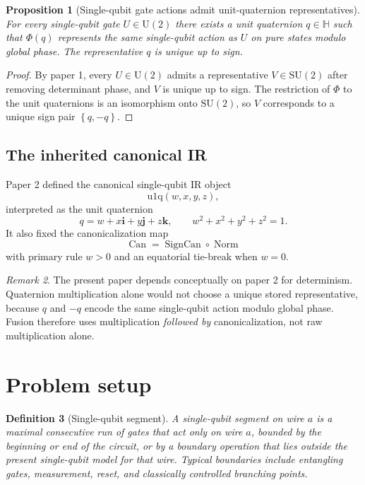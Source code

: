 \documentclass[11pt]{article}
\newtheorem{definition}{Definition}[section]
\newtheorem{proposition}[definition]{Proposition}
\theoremstyle{remark}
\newtheorem{remark}[definition]{Remark}
\newcommand{\HH}{\mathbb{H}}
\newcommand{\SU}{\mathrm{SU}}
\newcommand{\U}{\mathrm{U}}
\newcommand{\ii}{\mathbf{i}}
\newcommand{\jj}{\mathbf{j}}
\newcommand{\kk}{\mathbf{k}}
\newcommand{\set}[1]{\left\{ #1 \right\}}
\newcommand{\uoneq}{\mathrm{u1q}}
\newcommand{\normalize}{\operatorname{Norm}}
\newcommand{\sgncanon}{\operatorname{SignCan}}
\newcommand{\canon}{\operatorname{Can}}
\begin{document}
\begin{proposition}[Single-qubit gate actions admit unit-quaternion representatives]
For every single-qubit gate $U\in\U(2)$ there exists a unit quaternion
$q\in\HH$ such that $\Phi(q)$ represents the same single-qubit action as $U$ on
pure states modulo global phase. The representative $q$ is unique up to sign.
\end{proposition}

\begin{proof}
By paper 1, every $U\in\U(2)$ admits a representative $V\in\SU(2)$ after
removing determinant phase, and $V$ is unique up to sign. The restriction of
$\Phi$ to the unit quaternions is an isomorphism onto $\SU(2)$, so $V$
corresponds to a unique sign pair $\set{q,-q}$.
\end{proof}

\subsection{The inherited canonical IR}

Paper 2 defined the canonical single-qubit IR object
\[
\uoneq(w,x,y,z),
\]
interpreted as the unit quaternion
\[
q=w+x\ii+y\jj+z\kk,\qquad w^2+x^2+y^2+z^2=1.
\]
It also fixed the canonicalization map
\[
\canon=\sgncanon\circ\normalize
\]
with primary rule $w>0$ and an equatorial tie-break when $w=0$.

\begin{remark}
The present paper depends conceptually on paper 2 for determinism. Quaternion
multiplication alone would not choose a unique stored representative, because
$q$ and $-q$ encode the same single-qubit action modulo global phase. Fusion
therefore uses multiplication \emph{followed by} canonicalization, not raw
multiplication alone.
\end{remark}

\section{Problem setup}

\begin{definition}[Single-qubit segment]
A \emph{single-qubit segment} on wire $a$ is a maximal consecutive run of gates
that act only on wire $a$, bounded by the beginning or end of the circuit, or
by a boundary operation that lies outside the present single-qubit model for
that wire. Typical boundaries include entangling gates, measurement, reset, and
classically controlled branching points.
\end{definition}
\end{document}
